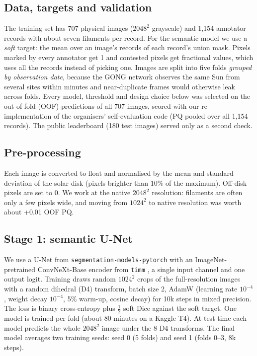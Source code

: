 \documentclass[sigconf]{acmart}
\begin{document}
\subsection{Data, targets and validation}
    The training set has 707 physical images ($2048^2$ grayscale) and 1,154 annotator records with about seven filaments per record. For the semantic model we use a \emph{soft} target: the mean over an image's records of each record's union mask. Pixels marked by every annotator get 1 and contested pixels get fractional values, which uses all the records instead of picking one. Images are split into five folds \emph{grouped by observation date}, because the GONG network observes the same Sun from several sites within minutes and near-duplicate frames would otherwise leak across folds. Every model, threshold and design choice below was selected on the out-of-fold (OOF) predictions of all 707 images, scored with our re-implementation of the organisers' self-evaluation code (PQ pooled over all 1,154 records). The public leaderboard (180 test images) served only as a second check.

\subsection{Pre-processing}
    Each image is converted to float and normalised by the mean and standard deviation of the solar disk (pixels brighter than 10\% of the maximum). Off-disk pixels are set to 0. We work at the native $2048^2$ resolution: filaments are often only a few pixels wide, and moving from $1024^2$ to native resolution was worth about +0.01 OOF PQ.

\subsection{Stage 1: semantic U-Net}
    We use a U-Net \cite{ronneberger2015unet} from \texttt{segmentation-models-pytorch} \cite{smp} with an ImageNet-pretrained ConvNeXt-Base encoder \cite{liu2022convnext} from \texttt{timm} \cite{timm}, a single input channel and one output logit. Training draws random $1024^2$ crops of the full-resolution images with a random dihedral (D4) transform, batch size 2, AdamW \cite{loshchilov2019adamw} (learning rate $10^{-4}$, weight decay $10^{-4}$, 5\% warm-up, cosine decay) for 10k steps in mixed precision. The loss is binary cross-entropy plus $\tfrac12$ soft Dice against the soft target. One model is trained per fold (about 80 minutes on a Kaggle T4). At test time each model predicts the whole $2048^2$ image under the 8 D4 transforms. The final model averages two training seeds: seed 0 (5 folds) and seed 1 (folds 0--3, 8k steps).
\end{document}
